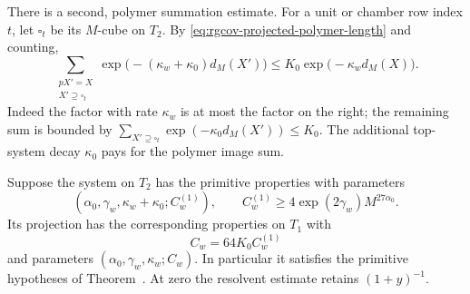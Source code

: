 There is a second, polymer summation estimate. For a
unit or chamber row index $t$, let $\square_t$ be its
$M$-cube on $T_2$. By
\eqref{eq:rgcov-projected-polymer-length} and counting,
\begin{equation}\label{eq:rgcov-polymer-image-sum}
 \sum_{\substack{pX'=X\\X'\supseteq\square_t}}
    \exp\big(-(\kappa_w+\kappa_0)d_M(X')\big)
                 \le K_0\exp\big(-\kappa_wd_M(X)\big).
\end{equation}
Indeed the factor with rate $\kappa_w$ is at most
the factor on the right; the remaining sum is bounded
by $\sum_{X'\supseteq\square_t}\exp(-\kappa_0d_M(X'))\le K_0$.
The additional top-system decay $\kappa_0$ pays for the
polymer image sum.

\begin{proposition}\label{prop:rgcov-projected-system}
Suppose the system on $T_2$ has the primitive properties
with parameters
\[
 (\alpha_0,\gamma_w,\kappa_w+\kappa_0;C_w^{(1)}),
 \qquad C_w^{(1)}\ge4\exp(2\gamma_w)M^{27\alpha_0}.
\]
Its projection has the corresponding properties on $T_1$
with
\begin{equation}\label{eq:rgcov-common-constant}
                          C_w=64K_0C_w^{(1)}
\end{equation}
and parameters $(\alpha_0,\gamma_w,\kappa_w;C_w)$.
In particular it satisfies the primitive hypotheses of
Theorem~.
At zero the resolvent estimate retains $(1+y)^{-1}$.
\end{proposition}

